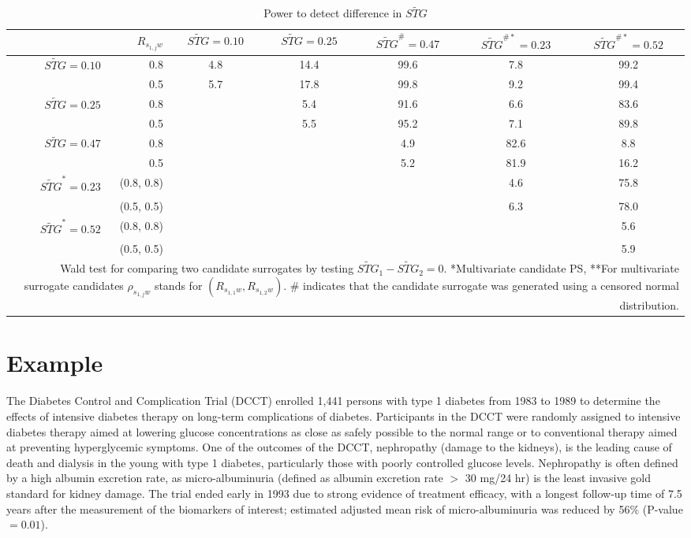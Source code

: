 \documentclass[times, doublespace]{simauth}
\begin{document}
\begin{table}
\begin{center}
\caption{Power to detect difference in $\widetilde{STG}$ \label{IPow}}
\begin{tabular}{rrccccc}
  \hline
 & $R_{s_{1,j}w}$ & $\widetilde{STG}=0.10$  & $\widetilde{STG}=0.25$  & $\widetilde{STG}^{\#}=0.47$& $\widetilde{STG}^{\#*}=0.23$  & $\widetilde{STG}^{\#*}=0.52$\\
  \hline
$\widetilde{STG}=0.10$ & 0.8 & 4.8 & 14.4 & 99.6 & 7.8 & 99.2 \\ 
&  0.5  & 5.7 & 17.8 & 99.8 & 9.2 & 99.4 \\ 
 $\widetilde{STG}=0.25$ & 0.8 &  & 5.4 & 91.6 & 6.6 & 83.6 \\ 
&  0.5 &  & 5.5 & 95.2 & 7.1 & 89.8 \\ 
$\widetilde{STG}=0.47$ & 0.8 &  &  & 4.9 & 82.6 & 8.8 \\ 
 & 0.5 &  &  & 5.2 & 81.9 & 16.2 \\ 
$\widetilde{STG}^{*}=0.23$ & (0.8, 0.8) &  &  &  & 4.6 & 75.8 \\ 
&  (0.5, 0.5) &  &  &  & 6.3 & 78.0 \\ 
$\widetilde{STG}^{*}=0.52$ & (0.8, 0.8) &  &  &  &  & 5.6 \\ 
 & (0.5, 0.5) &  &  &  &  & 5.9 \\ 
   \hline
\multicolumn{7}{p{9in}}{Wald test for comparing two candidate surrogates by testing $\widetilde{STG}_1-\widetilde{STG}_2=0$. *Multivariate candidate PS, **For multivariate surrogate candidates $\rho_{s_{1,j}w}$ stands for $(R_{s_{1,1}w},R_{s_{1,2}w})$. \# indicates that the candidate surrogate was generated using a censored normal distribution.}
\end{tabular}
\end{center}
\end{table}


\section{Example}
The Diabetes Control and Complication Trial (DCCT) enrolled 1,441 persons with type 1 diabetes from 1983 to 1989 to determine the effects of intensive diabetes therapy on long-term complications of diabetes. Participants in the DCCT were randomly assigned to intensive diabetes therapy aimed at lowering glucose concentrations as close as safely possible to the normal range or to conventional therapy aimed at preventing hyperglycemic symptoms. One of the outcomes of the DCCT, nephropathy (damage to the kidneys), is the leading cause of death and dialysis in the young with type 1 diabetes, particularly those with poorly controlled glucose levels. Nephropathy is often defined by a high albumin excretion rate, as micro-albuminuria (defined as albumin excretion rate $>$ 30 mg/24 hr) is the least invasive gold standard for kidney damage. The trial ended early in 1993 due to strong evidence of treatment efficacy, with a longest follow-up time of 7.5 years after the measurement of the biomarkers of interest; estimated adjusted mean risk of micro-albuminuria was reduced by 56\% (P-value $=0.01$)\citep{DCCT}. 
\end{document}
